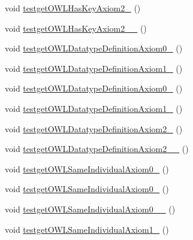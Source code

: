 \begin{DoxyCompactItemize}
\item 
void \hyperlink{classorg_1_1semanticweb_1_1owlapi_1_1api_1_1test_1_1_null_check_test_case_aaa5b05d4c82e2ef3dd9a0f47bc972361}{testget\-O\-W\-L\-Has\-Key\-Axiom2\-\_} ()
\item 
void \hyperlink{classorg_1_1semanticweb_1_1owlapi_1_1api_1_1test_1_1_null_check_test_case_a85c9a15319daffd9a5545bdc8cc9879e}{testget\-O\-W\-L\-Has\-Key\-Axiom2\-\_\-\_} ()
\item 
void \hyperlink{classorg_1_1semanticweb_1_1owlapi_1_1api_1_1test_1_1_null_check_test_case_a3b981d85b64d396cbc192dae2a382d19}{testget\-O\-W\-L\-Datatype\-Definition\-Axiom0\-\_} ()
\item 
void \hyperlink{classorg_1_1semanticweb_1_1owlapi_1_1api_1_1test_1_1_null_check_test_case_a0b85e77951921fcce347f026591add66}{testget\-O\-W\-L\-Datatype\-Definition\-Axiom1\-\_} ()
\item 
void \hyperlink{classorg_1_1semanticweb_1_1owlapi_1_1api_1_1test_1_1_null_check_test_case_a6233c9c3974ee2300009234a7b21af6c}{testget\-O\-W\-L\-Datatype\-Definition\-Axiom0\-\_} ()
\item 
void \hyperlink{classorg_1_1semanticweb_1_1owlapi_1_1api_1_1test_1_1_null_check_test_case_a16673d61463593dcb0ffc2912d370e71}{testget\-O\-W\-L\-Datatype\-Definition\-Axiom1\-\_} ()
\item 
void \hyperlink{classorg_1_1semanticweb_1_1owlapi_1_1api_1_1test_1_1_null_check_test_case_aab0d8e939247adc97b5a838f504a2784}{testget\-O\-W\-L\-Datatype\-Definition\-Axiom2\-\_} ()
\item 
void \hyperlink{classorg_1_1semanticweb_1_1owlapi_1_1api_1_1test_1_1_null_check_test_case_ac0936d65e2c03d3adadc7c1b071a308f}{testget\-O\-W\-L\-Datatype\-Definition\-Axiom2\-\_\-\_} ()
\item 
void \hyperlink{classorg_1_1semanticweb_1_1owlapi_1_1api_1_1test_1_1_null_check_test_case_a46db29a98f9f5403189b9c45287a7c1d}{testget\-O\-W\-L\-Same\-Individual\-Axiom0\-\_} ()
\item 
void \hyperlink{classorg_1_1semanticweb_1_1owlapi_1_1api_1_1test_1_1_null_check_test_case_a9ba25002ff48da7162747171273937c0}{testget\-O\-W\-L\-Same\-Individual\-Axiom0\-\_} ()
\item 
void \hyperlink{classorg_1_1semanticweb_1_1owlapi_1_1api_1_1test_1_1_null_check_test_case_a698129766b14bd26b834c631e62c33be}{testget\-O\-W\-L\-Same\-Individual\-Axiom0\-\_\-\_} ()
\item 
void \hyperlink{classorg_1_1semanticweb_1_1owlapi_1_1api_1_1test_1_1_null_check_test_case_a46ffc5d7f634e9ff26fdd8780f246f15}{testget\-O\-W\-L\-Same\-Individual\-Axiom1\-\_} ()

\end{DoxyCompactItemize}
